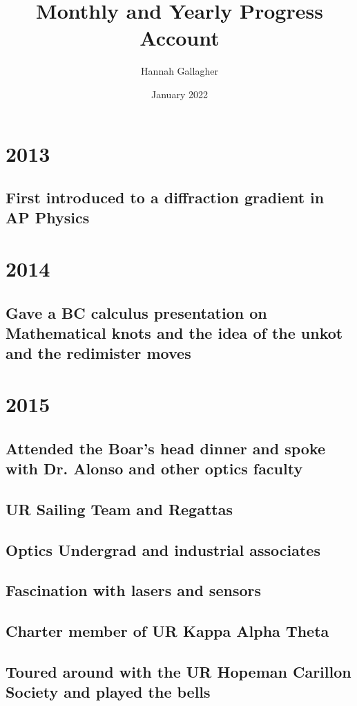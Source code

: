 \documentclass{article}
\title{Monthly and Yearly Progress Account}
\author{Hannah Gallagher}
\date{January 2022}
\begin{document}
\maketitle

\section{2013}
\subsection{First introduced to a diffraction gradient in AP Physics}
\section{2014}
\subsection{Gave a BC calculus presentation on Mathematical knots and the idea of the unkot and the redimister moves}
\section{2015}

\subsection{Attended the Boar's head dinner and spoke with Dr. Alonso and other optics faculty}
\subsection{UR Sailing Team and Regattas}
\subsection{Optics Undergrad and industrial associates}
\subsection{Fascination with lasers and sensors}
\subsection{Charter member of UR Kappa Alpha Theta}
\subsection{Toured around with the UR Hopeman Carillon Society and played the bells}
\end{document}
